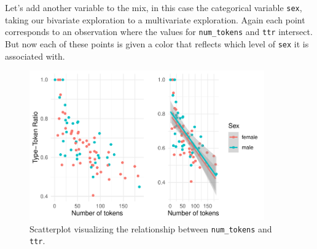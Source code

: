 \documentclass[
  letterpaper,
]{latex/krantz}
\begin{document}
Let's add another variable to the mix, in this case the categorical
variable \texttt{sex}, taking our bivariate exploration to a
multivariate exploration. Again each point corresponds to an observation
where the values for \texttt{num\_tokens} and \texttt{ttr} intersect.
But now each of these points is given a color that reflects which level
of \texttt{sex} it is associated with.

\begin{figure}

{\centering \includegraphics[width=0.9\textwidth,height=\textheight]{./approaching-analysis_files/figure-pdf/fig-summaries-multivariate-scatterplot-belc-1.pdf}

}

\caption{\label{fig-summaries-multivariate-scatterplot-belc}Scatterplot
visualizing the relationship between \texttt{num\_tokens} and
\texttt{ttr}.}

\end{figure}
\end{document}
